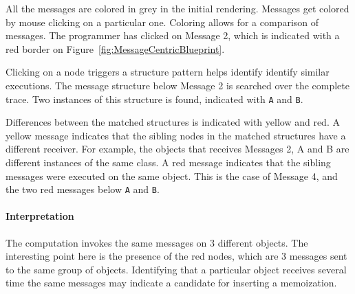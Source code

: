 \documentclass[10pt, conference, compsocconf]{IEEEtran}
\newcommand{\ct}{\lstinline[backgroundcolor=\color{white},basicstyle=\footnotesize\ttfamily]}
\newcommand{\ab}[1]{\nb{Alexandre}{blue}{#1}}
\newcommand{\jp}[1]{\nb{Juan Pablo}{green}{#1}}
\newcommand{\figref}[1]{Figure~\ref{fig:#1}}
\begin{document}
All the messages are colored in grey in the initial rendering. Messages get colored by mouse clicking on a particular one. 
Coloring allows for a comparison of messages. The programmer has clicked on Message 2, which is indicated with a red border on \figref{MessageCentricBlueprint}. 

Clicking on a node triggers a structure pattern helps identify identify similar executions. The message structure below Message 2 is searched over the complete trace. Two instances of this structure is found, indicated with \ct{A} and \ct{B}.

Differences between the matched structures is indicated with yellow and red. A yellow message indicates that the sibling nodes in the matched structures have a different receiver. For example, the objects that receives Messages 2, A and B are different instances of the same class. A red message indicates that the sibling messages were executed on the same object. This is the case of Message 4, and the two red messages below \ct{A} and \ct{B}. 



\paragraph{Interpretation}
The computation invokes the same messages on 3 different objects. The interesting point here is the presence of the red nodes, which are 3 messages sent to the same group of objects. Identifying that a particular object receives several time the same messages may indicate a candidate for inserting a memoization. 

\end{document}
